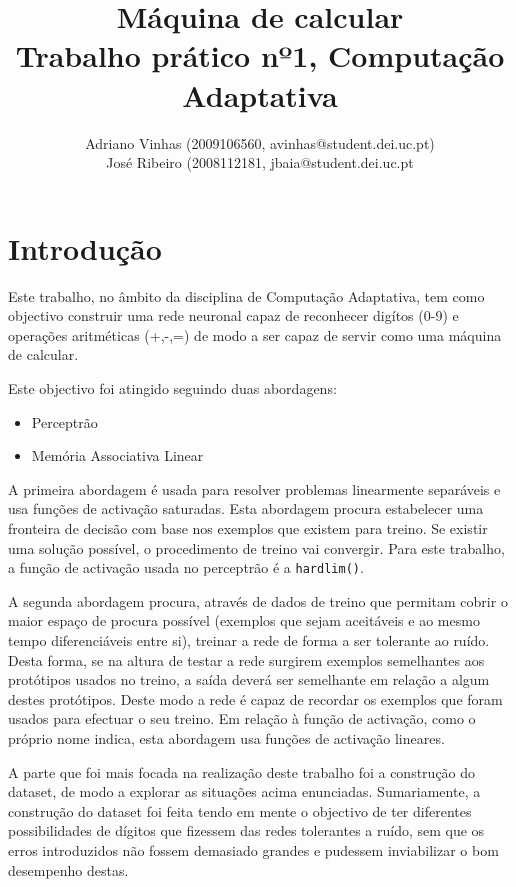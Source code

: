 \documentclass{article}
\begin{document}
\title{Máquina de calcular \\ Trabalho prático nº1, Computação Adaptativa}
\author{Adriano Vinhas (2009106560, avinhas@student.dei.uc.pt)\\
		José Ribeiro (2008112181, jbaia@student.dei.uc.pt}
\maketitle
\clearpage

\section{Introdução}

Este trabalho, no âmbito da disciplina de Computação Adaptativa, tem como objectivo construir uma rede neuronal capaz de reconhecer digítos (0-9) e operações aritméticas (+,-,=) de modo a ser capaz de servir como uma máquina de calcular.

Este objectivo foi atingido seguindo duas abordagens:
\begin{itemize}
\item Perceptrão
\item Memória Associativa Linear
\end{itemize}

A primeira abordagem é usada para resolver problemas linearmente separáveis e usa funções de activação saturadas. Esta abordagem procura estabelecer uma fronteira de decisão com base nos exemplos que existem para treino. Se existir uma solução possível, o procedimento de treino vai convergir. Para este trabalho, a função de activação usada no perceptrão é a \texttt{hardlim()}.

A segunda abordagem procura, através de dados de treino que permitam cobrir o maior espaço de procura possível (exemplos que sejam aceitáveis e ao mesmo tempo diferenciáveis entre si), treinar a rede de forma a ser tolerante ao ruído. Desta forma, se na altura de testar a rede surgirem exemplos semelhantes aos protótipos usados no treino, a saída deverá ser semelhante em relação a algum destes protótipos. Deste modo a rede é capaz de recordar os exemplos que foram usados para efectuar o seu treino. Em relação à função de activação, como o próprio nome indica, esta abordagem usa funções de activação lineares.

A parte que foi mais focada na realização deste trabalho foi a construção do dataset, de modo a explorar as situações acima enunciadas. Sumariamente, a construção do dataset foi feita tendo em mente o objectivo de ter diferentes possibilidades de dígitos que fizessem das redes tolerantes a ruído, sem que os erros introduzidos não fossem demasiado grandes e pudessem inviabilizar o bom desempenho destas.
\end{document}
